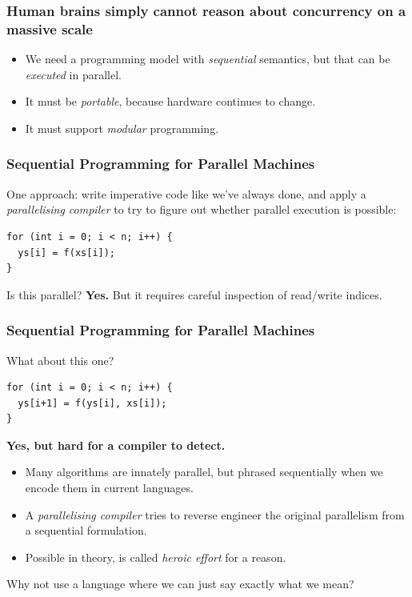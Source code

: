 \documentclass[rgb,dvipsnames]{beamer}
\begin{document}
\begin{frame}
  \frametitle{Human brains simply cannot reason about concurrency on a massive scale}

  \begin{itemize}
    \item We need a programming model with \textit{sequential}
      semantics, but that can be \textit{executed} in parallel.
    \item It must be \textit{portable}, because hardware continues to
      change.
    \item It must support \textit{modular} programming.
  \end{itemize}

\end{frame}

\begin{frame}[fragile]
  \frametitle{Sequential Programming for Parallel Machines}

  One approach: write imperative code like we've always done, and
  apply a \textit{parallelising compiler} to try to figure out whether
  parallel execution is possible:

\begin{verbatim}
for (int i = 0; i < n; i++) {
  ys[i] = f(xs[i]);
}
\end{verbatim}

  Is this parallel?  \textbf{Yes.}  But it requires careful inspection
  of read/write indices.
\end{frame}


\begin{frame}[fragile]
  \frametitle{Sequential Programming for Parallel Machines}

  What about this one?

\begin{verbatim}
for (int i = 0; i < n; i++) {
  ys[i+1] = f(ys[i], xs[i]);
}
\end{verbatim}

  \textbf{Yes, but hard for a compiler to detect.}

  \begin{itemize}
  \item Many algorithms are innately parallel, but phrased
    sequentially when we encode them in current languages.
  \item A \textit{parallelising compiler} tries to reverse engineer
    the original parallelism from a sequential formulation.
  \item Possible in theory, is called \textit{heroic effort} for a
    reason.
  \end{itemize}

Why not use a language where we can just say exactly what we mean?

\end{frame}
\end{document}
